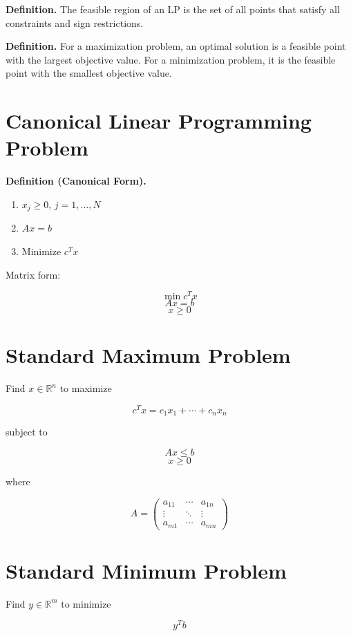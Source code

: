 \documentclass[12pt]{article}
\begin{document}
\textbf{Definition.}  
The feasible region of an LP is the set of all points that satisfy all constraints and sign restrictions.

\textbf{Definition.}  
For a maximization problem, an optimal solution is a feasible point with the largest objective value.  
For a minimization problem, it is the feasible point with the smallest objective value.

\section{Canonical Linear Programming Problem}

\textbf{Definition (Canonical Form).}

\begin{enumerate}
\item $x_j \ge 0$, $j = 1,\dots,N$
\item $Ax = b$
\item Minimize $c^T x$
\end{enumerate}

Matrix form:

\[
\min c^T x
\]
\[
Ax = b
\]
\[
x \ge 0
\]

\section{Standard Maximum Problem}

Find $x \in \mathbb{R}^n$ to maximize

\[
c^T x = c_1x_1 + \cdots + c_n x_n
\]

subject to

\[
Ax \le b
\]
\[
x \ge 0
\]

where

\[
A =
\begin{pmatrix}
a_{11} & \cdots & a_{1n} \\
\vdots & \ddots & \vdots \\
a_{m1} & \cdots & a_{mn}
\end{pmatrix}
\]

\section{Standard Minimum Problem}

Find $y \in \mathbb{R}^m$ to minimize

\[
y^T b
\]
\end{document}
